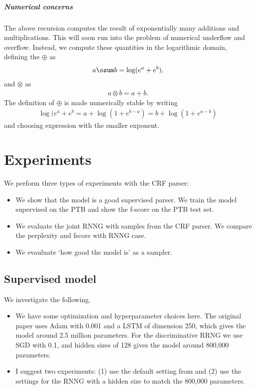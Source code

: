 \subparagraph{Numerical concerns}
The above recursion computes the result of exponentially many additions and multiplications. This will soon run into the problem of numerical underflow and overflow. Instead, we compute these quantities in the logarithmic domain, defining the $\oplus$ as
\begin{align*}
  a \osum b = \log(e^{a} + e^{b}),
\end{align*}
and $\otimes$ as
\begin{align*}
  a \otimes b = a + b.
\end{align*}
The definition of $\oplus$ is made numerically stable by writing
\begin{align*}
  \log(e^{a} + e^{b} = a + \log(1 + e^{b-a}) = b + \log(1 + e^{a-b})
\end{align*}
and choosing expression with the smaller exponent.


\section{Experiments}
We perform three types of experiments with the CRF parser:
\begin{itemize}
  \item We show that the model is a good supervised parser. We train the model supervised on the PTB and show the f-score on the PTB test set.
  \item We evaluate the joint RNNG with samples from the CRF parser. We compare the perplexity and fscore with RNNG case.
  \item We evauluate `how good the model is' as a sampler.
\end{itemize}

\subsection{Supervised model} We investigate the following.
\begin{itemize}
  \item We have some optimization and hyperparameter choices here. The original paper uses Adam with 0.001 and a LSTM of dimension 250, which gives the model around 2.5 million parameters. For the discriminative RRNG we use SGD with 0.1, and hidden sizes of 128 gives the model around 800,000 parameters.
  \item I suggest two experiments: (1) use the default setting from \citep{stern2017minimal} and (2) use the settings for the RNNG with a hidden size to match the 800,000 parameters.
\end{itemize}

